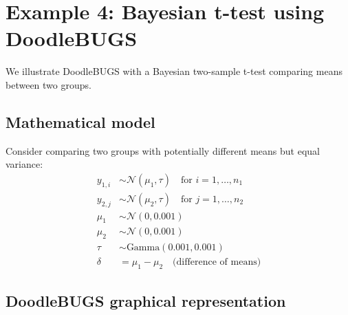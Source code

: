 \section{Example 4: Bayesian t-test using DoodleBUGS}

We illustrate DoodleBUGS with a Bayesian two-sample t-test comparing means between two groups.

\subsection{Mathematical model}

Consider comparing two groups with potentially different means but equal variance:
\begin{align}
y_{1,i} &\sim \mathcal{N}(\mu_1, \tau) \quad \text{for } i = 1, \ldots, n_1 \\
y_{2,j} &\sim \mathcal{N}(\mu_2, \tau) \quad \text{for } j = 1, \ldots, n_2 \\
\mu_1 &\sim \mathcal{N}(0, 0.001) \\
\mu_2 &\sim \mathcal{N}(0, 0.001) \\
\tau &\sim \text{Gamma}(0.001, 0.001) \\
\delta &= \mu_1 - \mu_2 \quad \text{(difference of means)}
\end{align}

\subsection{DoodleBUGS graphical representation}

